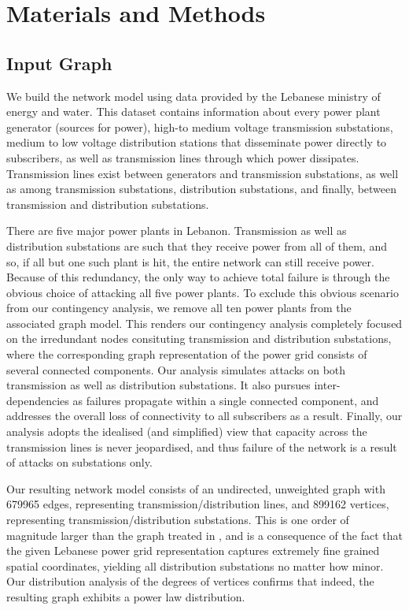 
\section{Materials and Methods}
\label{methods}

\subsection{Input Graph}

We build the network model using data provided by the Lebanese ministry of energy and water. This dataset contains information about every power plant generator (sources for power), high-to medium voltage transmission substations, medium to low voltage distribution stations that disseminate power directly to subscribers, as well as transmission lines through which power dissipates. Transmission lines exist between generators and transmission substations, as well as among transmission substations, distribution substations, and finally, between transmission and distribution substations. 

There are five major power plants in Lebanon. Transmission as well as distribution substations are such that they receive power from all of them, and so, if all but one such plant is hit, the entire network can still receive power. Because of this redundancy, the only way to achieve total failure is through the obvious choice of attacking all five power plants. To exclude this obvious scenario from our contingency analysis, we remove all ten power plants from the associated graph model. This renders our contingency analysis completely focused on the irredundant nodes consituting transmission and distribution substations, where the corresponding graph representation of the power grid consists of several connected components. Our analysis simulates attacks on both transmission as well as distribution substations. It also pursues inter-dependencies as failures propagate within a single connected component, and addresses the overall loss of connectivity to all subscribers as a result. Finally, our analysis adopts the idealised (and simplified) view that capacity across the transmission lines is never jeopardised, and thus failure of the network is a result of attacks on substations only.

Our resulting network model consists of an undirected, unweighted graph with 679965 edges, representing transmission/distribution lines, and 899162 vertices, representing transmission/distribution substations. This is one order of magnitude larger than the graph treated in \cite{2000Natur.406..378A}, and is a consequence of the fact that the given Lebanese power grid representation captures extremely fine grained spatial coordinates, yielding all distribution substations no matter how minor. Our distribution analysis of the degrees of vertices confirms that indeed, the resulting graph exhibits a power law distribution. 

